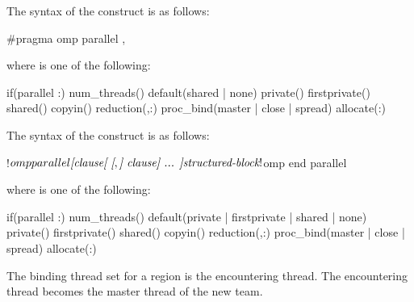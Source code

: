 \syntax
\begin{ccppspecific}
The syntax of the  construct is as follows:
\begin{ompcPragma}
#pragma omp parallel \plc{[clause[ [},\plc{] clause] ... ] new-line}
\end{ompcPragma}

where  is one of the following:

{}
\begin{indentedcodelist}
if(\plc{[}parallel :\plc{] scalar-expression})
num_threads()
default(shared \textnormal{|} none)
private()
firstprivate()
shared()
copyin()
reduction(\plc{[reduction-modifier },\plc{] reduction-identifier }:)
proc_bind(master \textnormal{|} close \textnormal{|} spread)
allocate(\plc{[allocator }:\plc{] list})
\end{indentedcodelist}
\end{ccppspecific}

\begin{fortranspecific}
The syntax of the  construct is as follows:

\begin{ompfPragma}
!$omp parallel \plc{[clause[ [},\plc{] clause] ... ]}
   \plc{structured-block}
!$omp end parallel
\end{ompfPragma}

\begin{samepage}
where  is one of the following:

{}
\begin{indentedcodelist}
if(\plc{[}parallel :\plc{] scalar-logical-expression})
num_threads()
default(private \textnormal{|} firstprivate \textnormal{|} shared \textnormal{|} none)
private()
firstprivate()
shared()
copyin()
reduction(\plc{[reduction-modifier },\plc{] reduction-identifier }:)
proc_bind(master \textnormal{|} close \textnormal{|} spread)
allocate(\plc{[allocator }:\plc{] list})
\end{indentedcodelist}
\end{samepage}

\end{fortranspecific}

\binding
The binding thread set for a  region is the encountering thread. The
encountering thread becomes the master thread of the new team.

